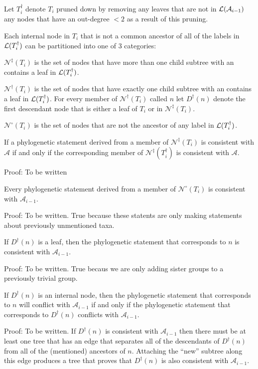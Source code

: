 \documentclass[11pt]{article}
\begin{document}
Let $T_i^{\dag}$ denote $T_i$ pruned down by removing any leaves that are not in $\mathcal{L}(\mathcal{A}_{i-1})$  any nodes that have an out-degree $<2$ as a result of this pruning.


Each internal node in $T_i$ that is not a common ancestor of all of the labels in $\mathcal{L}(T_i^{\dag})$ can be partitioned into one of 3 categories:
\begin{compactenum}
    \item $\mathcal{N}^{\ddag}(T_i)$ is the set of nodes that have more than one child subtree with an contains a leaf in $\mathcal{L}(T_i^{\dag})$.
    \item $\mathcal{N}^{\dag}(T_i)$ is the set of nodes that have exactly one child subtree with an contains a leaf in $\mathcal{L}(T_i^{\dag})$.
    For every member of $\mathcal{N}^{\dag}(T_i)$ called $n$ let $D^{\dag}(n)$ denote the first descendant node that is either a leaf of $T_i$ or in $\mathcal{N}^{\ddag}(T_i)$.
    \item $\mathcal{N}^{\circ}(T_i)$ is the set of nodes that are not the ancestor of any label in $\mathcal{L}(T_i^{\dag})$.
\end{compactenum}


\begin{theorem}
If a phylogenetic statement derived from a member of $\mathcal{N}^{\ddag}(T_i)$ is consistent with  $\mathcal{A}$ if and only if the corresponding member of $\mathcal{N}^{\ddag}(T_i^{\dag})$ is consistent with  $\mathcal{A}$.
\end{theorem}
Proof: To be written


\begin{theorem}
Every phylogenetic statement derived from a member of $\mathcal{N}^{\circ}(T_i)$ is consistent with  $\mathcal{A}_{i-1}$.
\end{theorem}
Proof: To be written. True because these statents are only making statements about previously unmentioned taxa.

\begin{theorem}
If $D^{\dag}(n)$ is a leaf, then the phylogenetic statement that corresponds
    to $n$ is consistent with $\mathcal{A}_{i-1}$.
\end{theorem}
Proof: To be written. True becaus we are only adding sister groups to a previously trivial group.


\begin{theorem}
If $D^{\dag}(n)$ is an internal node, then the phylogenetic statement
    that corresponds to $n$ will conflict with $\mathcal{A}_{i-1}$ if
    and only if the phylogenetic statement that corresponds to 
    $D^{\dag}(n)$ conflicts with $\mathcal{A}_{i-1}$.
\end{theorem}
Proof: To be written. If $D^{\dag}(n)$ is consistent with $\mathcal{A}_{i-1}$
then there must be at least one tree that has an edge that separates all of the 
descendants of $D^{\dag}(n)$ from all of the (mentioned) ancestors
of $n$.
Attaching the ``new'' subtree along this edge produces a tree that proves that 
  $D^{\dag}(n)$ is also consistent with $\mathcal{A}_{i-1}$.
\end{document}
